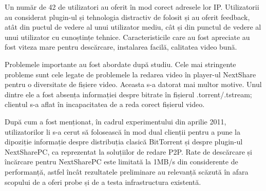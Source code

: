 Un număr de 42 de utilizatori au oferit în mod corect adresele lor IP. Utilizatorii
au considerat plugin-ul și tehnologia distractiv de folosit și au oferit feedback,
atât din puctul de vedere al unui utilizator mediu, cât și din punctul de vedere al
unui utilizator cu cunoștințe tehnice. Caracteristicile care au fost apreciate
au fost viteza mare pentru descărcare, instalarea facilă, calitatea video bună.

Problemele importante au fost abordate după studiu.  Cele mai stringente
probleme sunt cele legate de problemele la redarea video în player-ul
NextShare pentru o diversitate de fișiere video. Aceasta s-a datorat mai
multor motive. Unul dintre ele a fost absența informației despre bitrate în
fișierul .torrent/.tstream; clientul s-a aflat în incapacitatea de a reda
corect fișierul video.

După cum a fost menționat, în cadrul experimentului din aprilie 2011, utilizatorilor li s-a cerut să folosească în mod dual
clienții pentru a pune la dipoziție informație despre distribuția clasică
BitTorrent și despre plugin-ul NextSharePC, ca reprezentat la soluțiilor de
redare P2P. Rate de descărcare și încărcare pentru NextSharePC este limitată
la 1MB/s din considerente de performanță, astfel încât rezultatele preliminare
au relevanță scăzută în afara scopului de a oferi probe și de a testa
infrastructura existentă.

